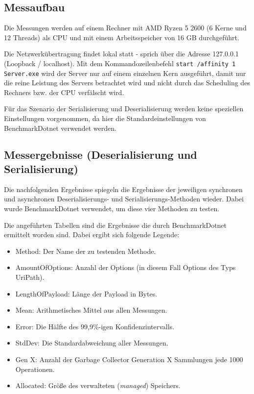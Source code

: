 \subsection{Messaufbau}
\label{subsec:messaufbau}

Die Messungen werden auf einem Rechner mit AMD Ryzen 5 2600 (6 Kerne und 12 Threads) als CPU und mit einem Arbeitsspeicher von 16 GB durchgeführt.

Die Netzwerkübertragung findet lokal statt - sprich über die Adresse 127.0.0.1 (Loopback / localhost). Mit dem Kommandozeilenbefehl \texttt{start /affinity 1 Server.exe} wird der Server nur auf einem einzelnen Kern ausgeführt, damit nur die reine Leistung des Servers betrachtet wird und nicht durch das Scheduling des Rechners bzw. der CPU verfälscht wird.

Für das Szenario der Serialisierung und Deserialisierung werden keine speziellen Einstellungen vorgenommen, da hier die Standardeinstellungen von BenchmarkDotnet verwendet werden.

\subsection{Messergebnisse (Deserialisierung und Serialisierung)}
\label{subsec:messergebnisse-deserialisierung-serialisierung}

Die nachfolgenden Ergebnisse spiegeln die Ergebnisse der jeweiligen synchronen und asynchronen Deserialisierungs- und Serialisierungs-Methoden wieder. Dabei wurde BenchmarkDotnet verwendet, um diese vier Methoden zu testen.

Die angeführten Tabellen sind die Ergebnisse die durch BenchmarkDotnet ermittelt worden sind. Dabei ergibt sich folgende Legende:
\begin{itemize}
    \item Method: Der Name der zu testenden Methode.
    \item AmountOfOptions: Anzahl der Options (in diesem Fall Options des Typs UriPath).
    \item LengthOfPayload: Länge der Payload in Bytes.
    \item Mean: Arithmetisches Mittel aus allen Messungen.
    \item Error: Die Hälfte des 99,9\%-igen Konfidenzintervalls.
    \item StdDev: Die Standardabweichung aller Messungen.
    \item Gen X: Anzahl der Garbage Collector Generation X Sammlungen jede 1000 Operationen.
    \item Allocated: Größe des verwalteten (\textit{managed}) Speichers.
\end{itemize}

